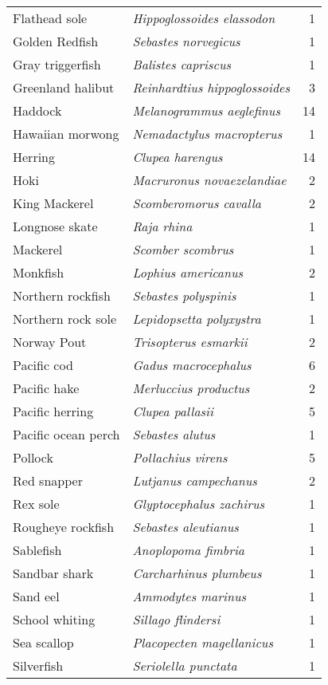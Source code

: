 \begin{tabular}{l | l | r}
Flathead sole & \textit{Hippoglossoides elassodon} & 1 \\
Golden Redfish & \textit{Sebastes norvegicus} & 1 \\
Gray triggerfish & \textit{Balistes capriscus} & 1 \\
Greenland halibut & \textit{Reinhardtius hippoglossoides} & 3 \\
Haddock & \textit{Melanogrammus aeglefinus} & 14 \\
Hawaiian morwong & \textit{Nemadactylus macropterus} & 1 \\
Herring & \textit{Clupea harengus} & 14 \\
Hoki & \textit{Macruronus novaezelandiae} & 2 \\
King Mackerel & \textit{Scomberomorus cavalla} & 2 \\
Longnose skate & \textit{Raja rhina} & 1 \\
Mackerel & \textit{Scomber scombrus} & 1 \\
Monkfish & \textit{Lophius americanus} & 2 \\
Northern rockfish & \textit{Sebastes polyspinis} & 1 \\
Northern rock sole & \textit{Lepidopsetta polyxystra} & 1 \\
Norway Pout & \textit{Trisopterus esmarkii} & 2 \\
Pacific cod & \textit{Gadus macrocephalus} & 6 \\
Pacific hake & \textit{Merluccius productus} & 2 \\
Pacific herring & \textit{Clupea pallasii} & 5 \\
Pacific ocean perch & \textit{Sebastes alutus} & 1 \\
Pollock & \textit{Pollachius virens} & 5 \\
Red snapper & \textit{Lutjanus campechanus} & 2 \\
Rex sole & \textit{Glyptocephalus zachirus} & 1 \\
Rougheye rockfish & \textit{Sebastes aleutianus} & 1 \\
Sablefish & \textit{Anoplopoma fimbria} & 1 \\
Sandbar shark & \textit{Carcharhinus plumbeus} & 1 \\
Sand eel & \textit{Ammodytes marinus} & 1 \\
School whiting & \textit{Sillago flindersi} & 1 \\
Sea scallop & \textit{Placopecten magellanicus} & 1 \\
Silverfish & \textit{Seriolella punctata} & 1 \\

\end{tabular}
